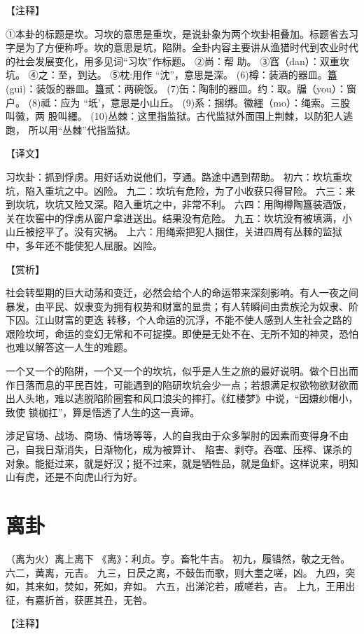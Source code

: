 \documentclass[a4paper,12pt,UTF8,twoside]{ctexbook}
\begin{document}
【注释】

①本卦的标题是坎。习坎的意思是重坎，是说卦象为两个坎卦相叠加。标题省去习字是为了方便称呼。坎的意思是坑，陷阱。全卦内容主要讲从渔猎时代到农业时代的社会发展变化，用多见词“习坎”作标题。
②尚：帮 助。
③窞（dan）：双重坎坑。
④之：至，到达。
⑤枕:用作 “沈”，意思是深。
(6)樽：装酒的器皿。簋(gui)：装饭的器皿。簋贰：两碗饭。
(7)缶：陶制的器皿。约：取。牖（you）：窗户。
(8)祗：应为 “坁’，意思是小山丘。
(9)系：捆绑。徽纆（mo）：绳索。三股叫徽，两 股叫纆。
(10)丛棘：这里指监狱。古代监狱外面围上荆棘，以防犯人逃跑， 所以用“丛棘”代指监狱。

【译文】

习坎卦：抓到俘虏。用好话劝说他们，亨通。路途中遇到帮助。
初六：坎坑重坎坑，陷入重坑之中。凶险。
九二：坎坑有危险，为了小收获只得冒险。
六三：来到坎坑，坎坑又险又深。陷入重坑之中，非常不利。
六四：用陶樽陶簋装酒饭，关在坎窖中的俘虏从窗户拿进送出。结果没有危险。
九五：坎坑没有被填满，小山丘被挖平了。没有灾祸。
上六：用绳索把犯人捆住，关进四周有丛棘的监狱中，多年还不能使犯人屈服。凶险。

【赏析】

社会转型期的巨大动荡和变迁，必然会给个人的命运带来深刻影响。有人一夜之间暴发，由平民、奴隶变为拥有权势和财富的显贵；有人转瞬间由贵族沦为奴隶、阶下囚。江山财富的更迭 转移，个人命运的沉浮，不能不使人感到人生社会之路的艰险坎坷，命运的变幻无常和不可捉摸。即使是无处不在、无所不知的神灵，恐怕也难以解答这一人生的难题。

一个又一个的陷阱，一个又一个的坎坑，似乎是人生之旅的最好说明。做个日出而作日落而息的平民百姓，可能遇到的陷研坎坑会少一点；若想满足权欲物欲财欲而出人头地，难以逃脱陷阶圈套和风口浪尖的摔打。《红楼梦》中说，“因嫌纱帽小，致使 锁枷扛”，算是悟透了人生的这一真谛。

涉足官场、战场、商场、情场等等，人的自我由于众多掣肘的因素而变得身不由己，自我日渐消失，日渐物化，成为被算计、 陷害、剥夺。吞噬、压榨、谋杀的对象。能挺过来，就是好汉；挺不过来，就是牺牲品，就是鱼虾。这样说来，明知山有虎，还是不向虎山行为好。

\chapter{离卦}

（离为火）离上离下
《离》：利贞。亨。畜牝牛吉。
初九，履错然，敬之无咎。
六二，黄离，元吉。
九三，日昃之离，不鼓缶而歌，则大耋之嗟，凶。
九四，突如，其来如，焚如，死如，弃如。
六五，出涕沱若，戚嗟若，吉。
上九，王用出征，有嘉折首，获匪其丑，无咎。

【注释】
\end{document}
